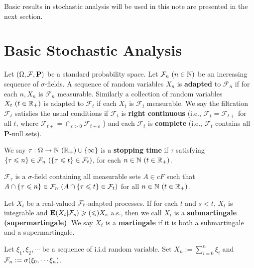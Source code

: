 \medskip

Basic results in stochastic analysis will be used in this note are presented in the next section.

\section{Basic Stochastic Analysis}

Let $(\Omega, {\mathcal F}, {\mathbf P})$ be a standard probability space. Let $\mathcal{F}_n\ (n\in {\mathbb N})$ be an increasing sequence of $\sigma$-fields. A sequence of random variables $X_n$ is {\bf adapted} to $\mathcal{F}_n$ if for each $n, X_n$ is $\mathcal{F}_n$ measurable. Similarly a collection of random variables $X_t\ (t\in {\mathbb R}_+)$ is adapted to $\mathcal{F}_t$ if each $X_t$ is $\mathcal{F}_t$ measurable. We say the filtration $\mathcal{F}_t$ satisfies the usual conditions if $\mathcal{F}_t$ is {\bf right continuous} (i.e., $\mathcal{F}_t=\mathcal{F}_{t+}$ for all $t$, where $\mathcal{F}_{t+}=\cap_{\varepsilon>0} \mathcal{F}_{t+\varepsilon}$ ) and each $\mathcal{F}_t$ is {\bf complete} (i.e., $\mathcal{F}_t$ contains all $\mathbf{P}$-null sets). 
	 
We say $\tau: \Omega\to {\mathbb N} \ ({\mathbb R}_+) \cup\{\infty\}$ is a {\bf stopping time} if $\tau$ satisfying $\{\tau\leq n\}\in \cF_n \ (\{\tau\leq t\}\in \cF_t)$, for each $n\in {\mathbb N} \ (t\in {\mathbb R}_+)$.  
	 
$\mathcal{F}_\tau$ is a $\sigma$-field containing all measurable sets $A\in cF$ such that $A \cap \{\tau \leqslant n\} \in \mathcal{F}_n\ (A \cap \{\tau \leqslant t\} \in{\mathcal F}_t)$ for all $n\in {\mathbb N}\ (t \in {\mathbb R}_+)$. 
		
	\begin{definition}
		Let $X_t$ be a real-valued ${\mathcal F}_t$-adapted processes. If for each $t$ and $s<t$, $X_t$ is integrable and ${\mathbf E}(X_t | {\mathcal F}_s) \geqslant (\leqslant) X_s$ a.s., then we call $X_t$ is a {\bf submartingale (supermartingale)}. We say $X_t$ is a {\bf martingale} if it is both a submartingale and a supermartingale. 
	\end{definition}
	
	\begin{example}
		Let $\xi_1, \xi_2, \cdots$ be a sequence of i.i.d random variable. Set $X_n:=\sum_{i=0}^n \xi_i$ and ${\mathcal F}_n:=\sigma(\xi_0,\cdots \xi_n)$. 
	\end{example}
	

